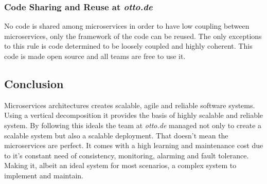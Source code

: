 \documentclass[14pt]{extarticle}
\begin{document}
	\subsubsection{Code Sharing and Reuse at \textit{otto.de}}
	No code is shared among microservices in order to have low coupling between microservices, only the framework of the code can be reused. The only exceptions to this rule is code determined to be loosely coupled and highly coherent. This code is made open source and all teams are free to use it.

\subsection{Conclusion}

Microservices architectures creates scalable, agile and reliable software systems. Using a vertical decomposition it provides the basis of highly scalable and reliable system. By following this ideals the team at \textit{otto.de} managed not only to create a scalable system but also a scalable deployment. That doesn't mean the microservices are perfect. It comes with a high learning and maintenance cost due to it's constant need of consistency, monitoring, alarming and fault tolerance. Making it, albeit an ideal system for most scenarios, a complex system to implement and maintain.
\end{document}
